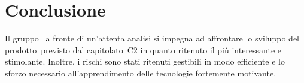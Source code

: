 \documentclass[../StudioDiFattibilita.tex]{subfiles}
\begin{document}
\section{Conclusione}
Il gruppo \leaf\ a fronte di un'attenta analisi si impegna ad affrontare lo sviluppo del prodotto\g\ previsto dal capitolato\g\ C2 in quanto ritenuto il più interessante e stimolante. Inoltre, i rischi sono stati ritenuti gestibili in modo efficiente e lo sforzo necessario all'apprendimento delle tecnologie fortemente motivante.
\end{document}
